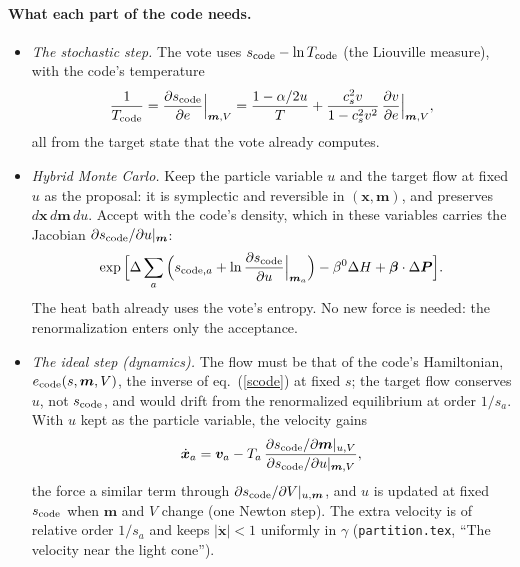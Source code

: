 \documentclass[11pt,aps,preprint,nofootinbib,superscriptaddress,tightenlines]{revtex4-2}
\def\st{\begin{equation}}
\def\stp{\end{equation}}
\def\Eq#1{eq.~(\ref{#1})}
\let\oldparagraph\paragraph
\renewcommand{\paragraph}{\par\bigskip\oldparagraph}
\begin{document}
\paragraph{What each part of the code needs.}
\begin{itemize}
\item \emph{The stochastic step.}  The vote uses $s_{\rm code}-\ln T_{\rm code}$ (the Liouville measure), with the code's temperature
  \st
  \frac1{T_{\rm code}}=\frac{\partial s_{\rm code}}{\partial e}\Big|_{\bm m,V}=\frac{1-\alpha/2u}{T}+\frac{c_s^2v}{1-c_s^2v^2}\,\frac{\partial v}{\partial e}\Big|_{\bm m,V} ,
  \stp
  all from the target state that the vote already computes.
\item \emph{Hybrid Monte Carlo.}  Keep the particle variable $u$ and the target flow at fixed $u$ as the proposal: it is symplectic and reversible in $(\bm x,\bm m)$, and
  preserves $d\bm x\,d\bm m\,du$.  Accept with the code's density, which in these variables carries the Jacobian $\partial s_{\rm code}/\partial u|_{\bm m}$:
  \st
  \exp\Big[\Delta\sum_a\Big(s_{{\rm code},a}+\ln\frac{\partial s_{\rm code}}{\partial u}\Big|_{\bm m_a}\Big)-\beta^0\Delta H+\bm\beta\cdot\Delta\bm P\Big] .
  \stp
  The heat bath already uses the vote's entropy.  No new force is needed: the renormalization enters only the acceptance.
\item \emph{The ideal step (dynamics).}  The flow must be that of the code's Hamiltonian, $e_{\rm code}(s,\bm m,V)$, the inverse of \Eq{scode} at fixed $s$; the target flow
  conserves $u$, not $s_{\rm code}$, and would drift from the renormalized equilibrium at order $1/s_a$.  With $u$ kept as the particle variable, the velocity gains
  \st
  \dot{\bm x}_a=\bm v_a-T_a\,\frac{\partial s_{\rm code}/\partial\bm m|_{u,V}}{\partial s_{\rm code}/\partial u|_{\bm m,V}} ,
  \stp
  the force a similar term through $\partial s_{\rm code}/\partial V|_{u,\bm m}$, and $u$ is updated at fixed $s_{\rm code}$ when $\bm m$ and $V$ change (one Newton step).
  The extra velocity is of relative order $1/s_a$ and keeps $|\dot{\bm x}|<1$ uniformly in $\gamma$ (\nolinkurl{partition.tex}, ``The velocity near the light cone'').
\end{itemize}
\end{document}
